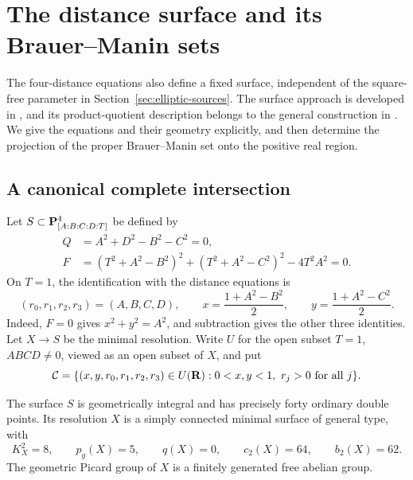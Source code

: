 \section{The distance surface and its Brauer--Manin sets}
\label{sec:surface}

The four-distance equations also define a fixed surface, independent of
the square-free parameter in Section~\ref{sec:elliptic-sources}.
The surface approach is developed in \cite{berry1990}, and its
product-quotient description belongs to the general construction in
\cite{corvajaturchetzannier2025}.  We give the equations and their geometry
explicitly, and then determine the projection of the proper Brauer--Manin
set onto the positive real region.

\subsection{A canonical complete intersection}

Let $S\subset\mathbf P^4_{[A:B:C:D:T]}$ be defined by
\begin{equation}\label{eq:surface-canonical}
 \begin{split}
 Q&=A^2+D^2-B^2-C^2=0,\\
 F&=(T^2+A^2-B^2)^2+(T^2+A^2-C^2)^2-4T^2A^2=0.
 \end{split}
\end{equation}
On $T=1$, the identification with the distance equations is
\begin{equation}\label{eq:surface-return}
 (r_0,r_1,r_2,r_3)=(A,B,C,D),\qquad
 x=\frac{1+A^2-B^2}{2},\qquad
 y=\frac{1+A^2-C^2}{2}.
\end{equation}
Indeed, $F=0$ gives $x^2+y^2=A^2$, and subtraction gives the other
three identities.  Let $X\to S$ be the minimal resolution.  Write $U$
for the open subset $T=1$, $ABCD\ne0$, viewed as an open subset of $X$,
and put
\[
 \mathcal C=\{(x,y,r_0,r_1,r_2,r_3)\in U(\mathbf R):
       0<x,y<1,\ r_j>0\text{ for all }j\}.
\]

\begin{proposition}\label{prop:surface-invariants}
The surface $S$ is geometrically integral and has precisely forty
ordinary double points.  Its resolution $X$ is a simply connected
minimal surface of general type, with
\[
 K_X^2=8,\qquad p_g(X)=5,\qquad q(X)=0,\qquad
 c_2(X)=64,\qquad b_2(X)=62.
\]
The geometric Picard group of $X$ is a finitely generated free abelian
group.
\end{proposition}

